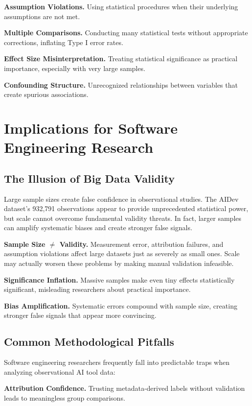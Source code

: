 \documentclass[conference]{IEEEtran}
\begin{document}
\textbf{Assumption Violations.} Using statistical procedures when their underlying assumptions are not met.

\textbf{Multiple Comparisons.} Conducting many statistical tests without appropriate corrections, inflating Type I error rates.

\textbf{Effect Size Misinterpretation.} Treating statistical significance as practical importance, especially with very large samples.

\textbf{Confounding Structure.} Unrecognized relationships between variables that create spurious associations.

\section{Implications for Software Engineering Research}

\subsection{The Illusion of Big Data Validity}

Large sample sizes create false confidence in observational studies. The AIDev dataset's 932,791 observations appear to provide unprecedented statistical power, but scale cannot overcome fundamental validity threats. In fact, larger samples can amplify systematic biases and create stronger false signals.

\textbf{Sample Size $\neq$ Validity.} Measurement error, attribution failures, and assumption violations affect large datasets just as severely as small ones. Scale may actually worsen these problems by making manual validation infeasible.

\textbf{Significance Inflation.} Massive samples make even tiny effects statistically significant, misleading researchers about practical importance.

\textbf{Bias Amplification.} Systematic errors compound with sample size, creating stronger false signals that appear more convincing.

\subsection{Common Methodological Pitfalls}

Software engineering researchers frequently fall into predictable traps when analyzing observational AI tool data:

\textbf{Attribution Confidence.} Trusting metadata-derived labels without validation leads to meaningless group comparisons.
\end{document}
